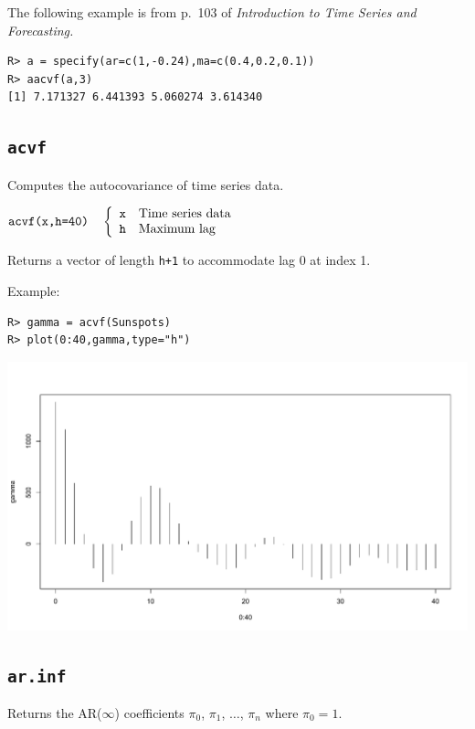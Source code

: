 \documentclass[11pt]{article}
\begin{document}
\bigskip
\noindent
The following example is from p.\ 103 of
{\it Introduction to Time Series and Forecasting.}

\begin{verbatim}
R> a = specify(ar=c(1,-0.24),ma=c(0.4,0.2,0.1))
R> aacvf(a,3)
[1] 7.171327 6.441393 5.060274 3.614340
\end{verbatim}

\newpage

\subsection{\tt acvf}
Computes the autocovariance of time series data.

\bigskip
$
\hbox{\tt acvf(x,h=40)}\quad\left\{\begin{array}{ll}
{\tt x} & \hbox{Time series data}\\
{\tt h} & \hbox{Maximum lag}
\end{array}\right.
$

\bigskip
\noindent
Returns a vector of length {\tt h+1} to accommodate lag 0
at index 1.

\bigskip
\noindent
Example:

\begin{verbatim}
R> gamma = acvf(Sunspots)
R> plot(0:40,gamma,type="h")
\end{verbatim}

\begin{center}
\includegraphics[scale=0.3]{Rplot-26.pdf}
\end{center}

\newpage

\subsection{\tt ar.inf}
Returns the AR($\infty$) coefficients
$\pi_0$, $\pi_1$, $\ldots$, $\pi_n$ where $\pi_0=1$.
\end{document}
